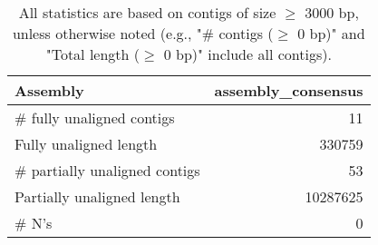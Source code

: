 \documentclass[12pt,a4paper]{article}
\begin{document}
\begin{table}[ht]
\begin{center}
\caption{All statistics are based on contigs of size $\geq$ 3000 bp, unless otherwise noted (e.g., "\# contigs ($\geq$ 0 bp)" and "Total length ($\geq$ 0 bp)" include all contigs).}
\begin{tabular}{|l*{1}{|r}|}
\hline
Assembly & assembly\_consensus \\ \hline
\# fully unaligned contigs & 11 \\ \hline
Fully unaligned length & 330759 \\ \hline
\# partially unaligned contigs & 53 \\ \hline
Partially unaligned length & 10287625 \\ \hline
\# N's & 0 \\ \hline
\end{tabular}
\end{center}
\end{table}
\end{document}
